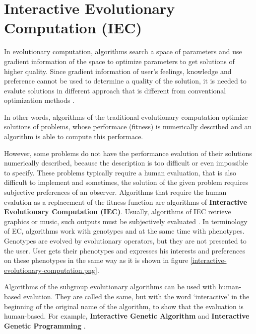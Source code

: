 \chapter{Interactive Evolutionary Computation (IEC)}

In evolutionary computation, algorithms search a space of parameters and use gradient information of the space to optimize parameters to get solutions of higher quality. Since gradient information of user's feelings, knowledge and preference cannot be used to determine a quality of the solution, it is needed to evalute solutions in different approach that is different from conventional optimization methods \cite{tagakipaper}.

In other words, algorithms of the traditional evolutionary computation optimize solutions of problems, whose performace (fitness) is numerically described and an algorithm is able to compute this performace.

However, some problems do not have the performance evalution of their solutions numerically described, because the description is too difficult or even impossible to specify. These problems typically require a human evaluation, that is also difficult to implement and sometimes, the solution of the given problem requires subjective preferences of an observer. Algorithms that require the human evalution as a replacement of the fitness function are algorithms of \textbf{Interactive Evolutionary Computation (IEC)}. Usually, algorithms of IEC retrieve graphics or music, such outputs must be subjectively evaluated \cite{tagakipaper}. In terminology of EC, algorithms work with genotypes and at the same time with phenotypes. Genotypes are evolved by evolutionary operators, but they are not presented to the user. User gets their phenotypes and expresses his interests and preferences on these phenotypes in the same way as it is shown in figure \ref{interactive-evolutionary-computation.png}.


Algorithms of the subgroup evolutionary algorithms can be used with human-based evalution. They are called the same, but with the word ‘interactive’ in the beginning of the original name of the algorithm, to show that the evaluation is human-based. For example, \textbf{Interactive Genetic Algorithm} and \textbf{Interactive Genetic Programming} \cite{tagakipaper}.


